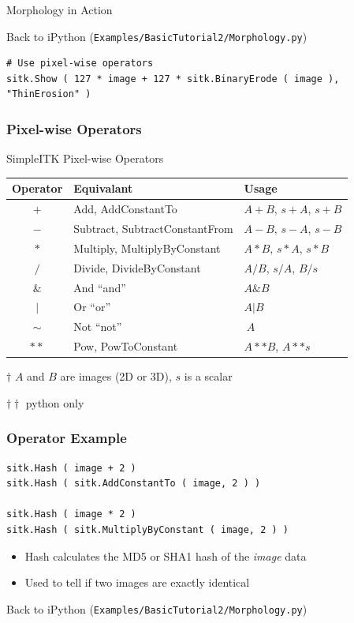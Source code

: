 \begin{frame}{Morphology in Action}
\center
\begin{center}
Back to iPython (\texttt{Examples/BasicTutorial2/Morphology.py})
\end{center}
\end{frame}

\begin{frame}[fragile]
\lstpython
\begin{lstlisting}
# Use pixel-wise operators
sitk.Show ( 127 * image + 127 * sitk.BinaryErode ( image ), "ThinErosion" )
\end{lstlisting}
\frametitle{Pixel-wise Operators}
\begin{threeparttable}
  \caption{SimpleITK Pixel-wise Operators}
  \begin{tabular}{c||l|l}
    Operator & Equivalant & Usage\tnote{$\dagger$} \\
    \hline
    $+$        & Add, AddConstantTo & $A + B$, $s+A$, $s+B$ \\
    $-$        & Subtract, SubtractConstantFrom & $A - B$, $s-A$, $s-B$ \\
    $*$        & Multiply, MultiplyByConstant & $A * B$, $s*A$, $s*B$ \\
    $/$        & Divide, DivideByConstant & $A / B$, $s/A$, $B/s$ \\
    $\&$        & And ``and'' & $A \& B$ \\
    $|$        & Or ``or'' & $A | B$ \\
    $\sim$        & Not ``not'' & $~A$ \\
    $**$\tnote{$\dagger\dagger$}  & Pow, PowToConstant & $A**B$, $A**s$
  \end{tabular}
  \begin{tablenotes}
    \item[$\dagger$] $A$ and $B$ are images (2D or 3D), $s$ is a scalar
    \item[$\dagger\dagger$] python only
  \end{tablenotes}
\end{threeparttable}
\end{frame}

\begin{frame}[fragile]
\frametitle{Operator Example}
\lstpython
\begin{lstlisting}
sitk.Hash ( image + 2 )
sitk.Hash ( sitk.AddConstantTo ( image, 2 ) )

sitk.Hash ( image * 2 )
sitk.Hash ( sitk.MultiplyByConstant ( image, 2 ) )
\end{lstlisting}

\begin{itemize}
  \item Hash calculates the MD5 or SHA1 hash of the \textit{image} data
  \item Used to tell if two images are exactly identical
\end{itemize}
Back to iPython (\texttt{Examples/BasicTutorial2/Morphology.py})
\end{frame}


